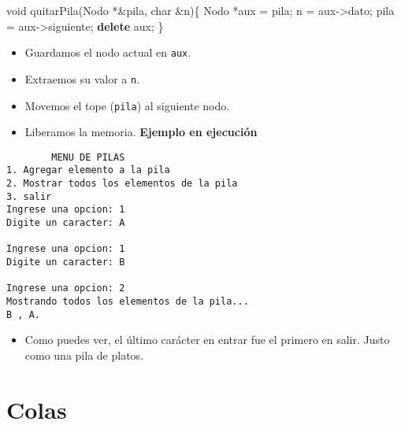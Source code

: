\documentclass[
  11pt,
  a4paper,
  DIV=11,
  numbers=noendperiod]{scrreprt}
\newenvironment{Shaded}{\begin{snugshade}}{\end{snugshade}}
\newcommand{\DataTypeTok}[1]{\textcolor[rgb]{0.68,0.00,0.00}{#1}}
\newcommand{\KeywordTok}[1]{\textcolor[rgb]{0.00,0.23,0.31}{\textbf{#1}}}
\newcommand{\NormalTok}[1]{\textcolor[rgb]{0.00,0.23,0.31}{#1}}
\newcommand{\OperatorTok}[1]{\textcolor[rgb]{0.37,0.37,0.37}{#1}}
\providecommand{\tightlist}{%
  \setlength{\itemsep}{0pt}\setlength{\parskip}{0pt}}
\begin{document}
\begin{Shaded}
\begin{Highlighting}[]
\DataTypeTok{void}\NormalTok{ quitarPila}\OperatorTok{(}\NormalTok{Nodo }\OperatorTok{*\&}\NormalTok{pila}\OperatorTok{,} \DataTypeTok{char} \OperatorTok{\&}\NormalTok{n}\OperatorTok{)\{}
\NormalTok{    Nodo }\OperatorTok{*}\NormalTok{aux }\OperatorTok{=}\NormalTok{ pila}\OperatorTok{;}
\NormalTok{    n }\OperatorTok{=}\NormalTok{ aux}\OperatorTok{{-}\textgreater{}}\NormalTok{dato}\OperatorTok{;}
\NormalTok{    pila }\OperatorTok{=}\NormalTok{ aux}\OperatorTok{{-}\textgreater{}}\NormalTok{siguiente}\OperatorTok{;}
    \KeywordTok{delete}\NormalTok{ aux}\OperatorTok{;}
\OperatorTok{\}}
\end{Highlighting}
\end{Shaded}

\begin{itemize}
\tightlist
\item
  Guardamos el nodo actual en \texttt{aux}.
\item
  Extraemos su valor a \texttt{n}.
\item
  Movemos el tope (\texttt{pila}) al siguiente nodo.
\item
  Liberamos la memoria. \textbf{Ejemplo en ejecución}
\end{itemize}

\begin{tcolorbox}[custombox]
\begin{verbatim}
        MENU DE PILAS
1. Agregar elemento a la pila
2. Mostrar todos los elementos de la pila
3. salir
Ingrese una opcion: 1
Digite un caracter: A

Ingrese una opcion: 1
Digite un caracter: B

Ingrese una opcion: 2
Mostrando todos los elementos de la pila...
B , A.
\end{verbatim}
\end{tcolorbox}

\begin{itemize}
\tightlist
\item
  Como puedes ver, el último carácter en entrar fue el primero en salir.
  Justo como una pila de platos.
\end{itemize}


\chapter{Colas}\label{colas}
\end{document}
